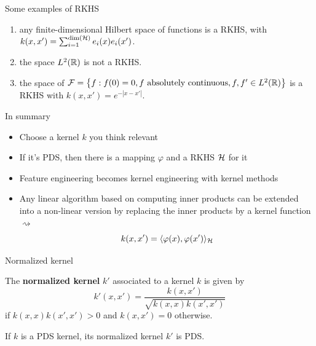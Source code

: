 \documentclass[xcolor={usenames,dvipsnames}]{beamer}
\begin{document}
 \begin{frame}{Some examples of RKHS}
  
  \begin{enumerate}
  \item any finite-dimensional Hilbert space of functions is a RKHS, with $k(x,x') =  \sum_{i=1}^{\dim(\mathcal{H})} e_i(x)e_i(x')$. 
  
  \pause
  \item the space $L^2(\mathbb{R})$ is not a RKHS. 
  
  \pause 
  \item the space of ${\mathcal{F}} = \left\{ f : f(0)=0, f \text{ absolutely continuous}, f,f'\in L^2(\mathbb{R}) \right\}$ is a RKHS with $k(x,x') = e^{-|x-x'|}$.
  \end{enumerate}
  
  \end{frame}

\begin{frame}{In summary}
  \begin{itemize}
    \item Choose a kernel $k$ you think relevant
    \item  If it's PDS, then there is a mapping $\varphi$ and a RKHS $\mathcal{H}$ for it
    \pause 
    \item Feature engineering becomes kernel engineering with kernel methods
    \pause 
    \item Any linear algorithm based on computing inner products can be extended into a non-linear version by replacing the inner products by a kernel function $\rightsquigarrow $ 
    $$
    k(x, x') = \langle {\varphi(x), \varphi(x')} \rangle_{\mathcal{H}}
    $$
  \end{itemize}
  \end{frame}


\begin{frame}{Normalized kernel}  
  \begin{definition}
  The \textbf{normalized kernel} $k'$ associated to a kernel $k$ is given by
  \begin{equation*}
    k'(x, x') = \frac{k(x, x')}{\sqrt{k(x, x) k(x', x')}}
  \end{equation*}
  if $k(x, x) k(x', x') > 0$ and $ k(x, x') = 0$ otherwise.
  \end{definition}

 \begin{theorem}
 If $k$ is a PDS kernel, its normalized kernel $k'$ is PDS.
 \end{theorem}
 
 \end{frame}
 
\end{document}
